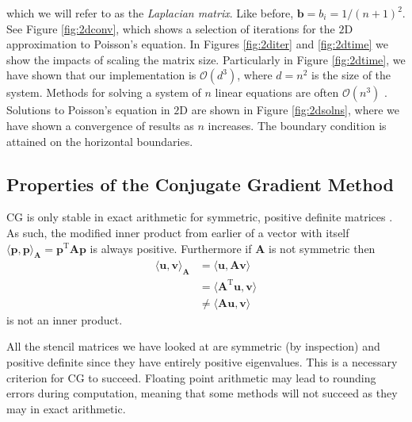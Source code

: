 \documentclass{article}
\begin{document}
which we will refer to as the \textit{Laplacian matrix}.
Like before, $\mathbf{b} = b_i = 1/(n+1)^2$.
See Figure \ref{fig:2dconv}, which shows a selection of iterations for the $2$D approximation to Poisson's equation.
In Figures \ref{fig:2diter} and \ref{fig:2dtime} we show the impacts of scaling the matrix size.
Particularly in Figure \ref{fig:2dtime}, we have shown that our implementation is $\mathcal{O}(d^3)$,
where $d=n^2$ is the size of the system.
Methods for solving a system of $n$ linear equations are often $\mathcal{O}(n^3)$ \cite{Meyer_2000}.
Solutions to Poisson's equation in $2$D are shown in Figure \ref{fig:2dsolns},
where we have shown a convergence of results as $n$ increases.
The boundary condition is attained on the horizontal boundaries.

\subsection{Properties of the Conjugate Gradient Method}

CG is only stable in exact arithmetic for symmetric, positive definite matrices \cite{Greenbaum_1997}.
As such, the modified inner product from earlier of a vector with itself $\langle \mathbf{p},\mathbf{p}\rangle_\mathbf{A} = \mathbf{p}^\mathrm{T}\mathbf{Ap}$ is always positive.
Furthermore if $\mathbf{A}$ is not symmetric then
\begin{align*}
	\langle \mathbf{u}, \mathbf{v} \rangle_\mathbf{A} &= \langle \mathbf{u}, \mathbf{Av} \rangle \\
	&= \langle \mathbf{A}^\mathrm{T}\mathbf{u}, \mathbf{v} \rangle \\
	&\neq \langle \mathbf{A}\mathbf{u}, \mathbf{v} \rangle
\end{align*}
is not an inner product.

All the stencil matrices we have looked at are symmetric (by inspection) and positive definite since they have entirely positive eigenvalues.
This is a necessary criterion for CG to succeed.
Floating point arithmetic may lead to rounding errors during computation, meaning that some methods will not succeed as they may in exact arithmetic.
\end{document}
